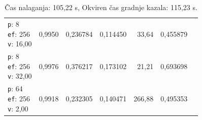 \begin{table}[htbp]
\begin{tabularx}{\textwidth}{Xrrrrrr}
    \makecell{\texttt{p}: 8\\\texttt{ef}: 256\\\texttt{v}: 16,00} & 0,9950 & 0,236784 & 0,114450 & 33,64 & 0,455879 \\
    \makecell{\texttt{p}: 8\\\texttt{ef}: 256\\\texttt{v}: 32,00} & 0,9976 & 0,376217 & 0,173102 & 21,21 & 0,693698 \\
    \makecell{\texttt{p}: 64\\\texttt{ef}: 256\\\texttt{v}: 2,00} & 0,9918 & 0,232305 & 0,140471 & 266,88 & 0,495353 \\
    \bottomrule
  \end{tabularx}
\caption* {Čas nalaganja: 105,22 s, Okviren čas gradnje kazala: 115,23 s.}\end{table}

